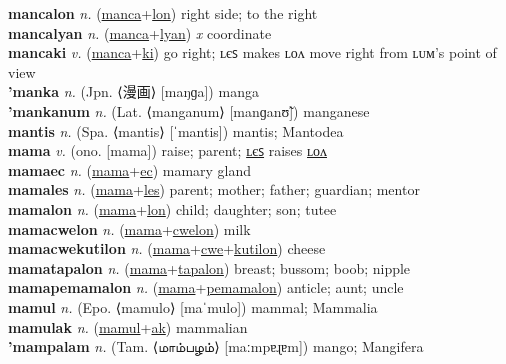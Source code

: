 \textbf{mancalon} \textit{n.} (\hyperref[manca]{manca}+\hyperref[lon]{lon})
right side; to the right \label{mancalon} \\
\textbf{mancalyan} \textit{n.} (\hyperref[manca]{manca}+\hyperref[lyan]{lyan})
\textit{x} coordinate \label{mancalyan} \\
\textbf{mancaki} \textit{v.} (\hyperref[manca]{manca}+\hyperref[ki]{ki})
go right; ʟєꜱ makes ʟᴏᴧ move right from ʟᴜᴍ’s point of view \label{mancaki} \\
\textbf{'manka} \textit{n.} (Jpn. ⟨漫画⟩ [maŋɡa])
manga \label{'manka} \\
\textbf{'mankanum} \textit{n.} (Lat. ⟨manganum⟩ [manɡanʊ̃])
manganese \label{'mankanum} \\
\textbf{mantis} \textit{n.} (Spa. ⟨mantis⟩ [ˈmantis])
mantis; Mantodea \label{mantis} \\
\textbf{mama} \textit{v.} (ono. [mama])
raise; parent; \hyperref[mamales]{ʟєꜱ} raises \hyperref[mamalon]{ʟᴏᴧ} \label{mama} \\
\textbf{mamaec} \textit{n.} (\hyperref[mama]{mama}+\hyperref[ec]{ec})
mamary gland \label{mamaec} \\
\textbf{mamales} \textit{n.} (\hyperref[mama]{mama}+\hyperref[les]{les})
parent; mother; father; guardian; mentor \label{mamales} \\
\textbf{mamalon} \textit{n.} (\hyperref[mama]{mama}+\hyperref[lon]{lon})
child; daughter; son; tutee \label{mamalon} \\
\textbf{mamacwelon} \textit{n.} (\hyperref[mama]{mama}+\hyperref[cwelon]{cwelon})
milk \label{mamacwelon} \\
\textbf{mamacwekutilon} \textit{n.} (\hyperref[mama]{mama}+\hyperref[cwe]{cwe}+\hyperref[kutilon]{kutilon})
cheese \label{mamacwekutilon} \\
\textbf{mamatapalon} \textit{n.} (\hyperref[mama]{mama}+\hyperref[tapalon]{tapalon})
breast; bussom; boob; nipple \label{mamatapalon} \\
\textbf{mamapemamalon} \textit{n.} (\hyperref[mama]{mama}+\hyperref[pemamalon]{pemamalon})
anticle; aunt; uncle \label{mamapemamalon} \\
\textbf{mamul} \textit{n.} (Epo. ⟨mamulo⟩ [maˈmulo])
mammal; Mammalia \label{mamul} \\
\textbf{mamulak} \textit{n.} (\hyperref[mamul]{mamul}+\hyperref[ak]{ak})
mammalian \label{mamulak} \\
\textbf{'mampalam} \textit{n.} (Tam. ⟨மாம்பழம்⟩ [maːmpɐɻɐm])
mango; Mangifera \label{'mampalam} \\
